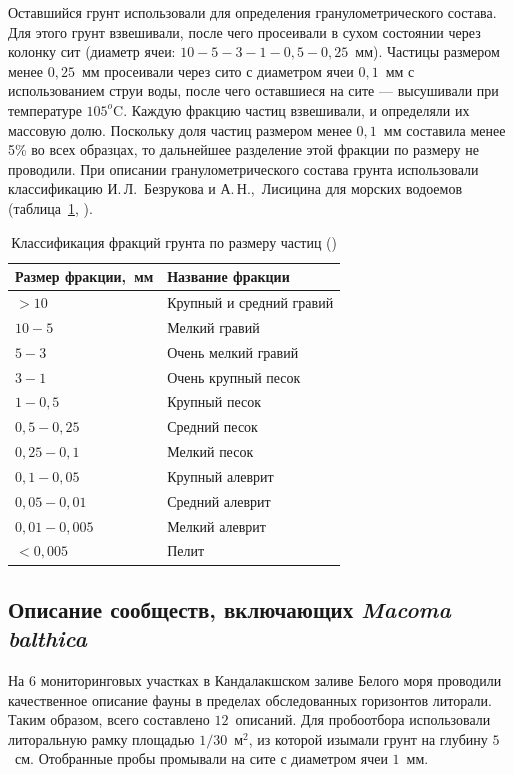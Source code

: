 Оставшийся грунт использовали для определения гранулометрического состава. 
Для этого грунт взвешивали, после чего просеивали в сухом состоянии через колонку сит (диаметр ячеи: $10 - 5 - 3 - 1 - 0,5 - 0,25$~мм). 
Частицы размером менее $0,25$~мм просеивали через сито с диаметром ячеи $0,1$~мм с использованием струи воды, после чего оставшиеся на сите --- высушивали при температуре $105^o$C. 
Каждую фракцию частиц взвешивали, и определяли их массовую долю. 
Поскольку доля частиц размером менее $0,1$~мм составила менее 5\% во всех образцах, то дальнейшее разделение этой фракции по размеру не проводили. 
При описании гранулометрического состава грунта использовали классификацию И.\,Л.~Безрукова и А.\,Н.,~Лисицина для морских водоемов (таблица~\ref{tab:lisicyn_granulometriya}, \cite{Bezrukov_Lisicyn_1960}).
\begin{table}[h]
    \centering
    \caption{Классификация фракций грунта по размеру частиц (\cite{Bezrukov_Lisicyn_1960})}
    \label{tab:lisicyn_granulometriya}
\begin{tabular}{|l|l|}
    \hline
    Размер фракции,~мм & Название фракции         \\ \hline
     $> 10$    & Крупный и средний гравий  \\
    $10-5$               & Мелкий гравий         \\
    $5-3$                & Очень мелкий гравий   \\
    $3-1$                & Очень крупный песок   \\
    $1-0,5$              & Крупный песок         \\
    $0,5-0,25$           & Средний песок         \\
    $0,25-0,1$           & Мелкий песок          \\
    $0,1-0,05$           & Крупный алеврит       \\
    $0,05-0,01$          & Средний алеврит       \\
    $0,01-0,005$         & Мелкий алеврит        \\
    $< 0,005$     & Пелит                   \\ \hline
\end{tabular}
\end{table}

    \subsection{Описание сообществ, включающих {\it Macoma balthica}}
На 6 мониторинговых участках в Кандалакшском заливе Белого моря проводили качественное описание фауны в пределах обследованных горизонтов литорали.
Таким образом, всего составлено $12$~описаний.
Для пробоотбора использовали литоральную рамку площадью $1/30$~м$^2$, из которой изымали грунт на глубину $5$~см. 
Отобранные пробы промывали на сите с диаметром ячеи $1$~мм. 

